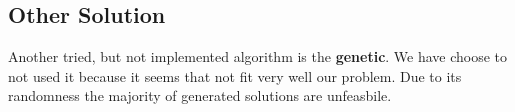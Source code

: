 \documentclass[12pt]{article}
\begin{document}
\subsection{Other Solution}
Another tried, but not implemented algorithm is the \textbf{genetic}. We have choose to not used it because it seems that not fit very well our problem. Due to its randomness the majority of generated solutions are unfeasbile.

\end{document}
